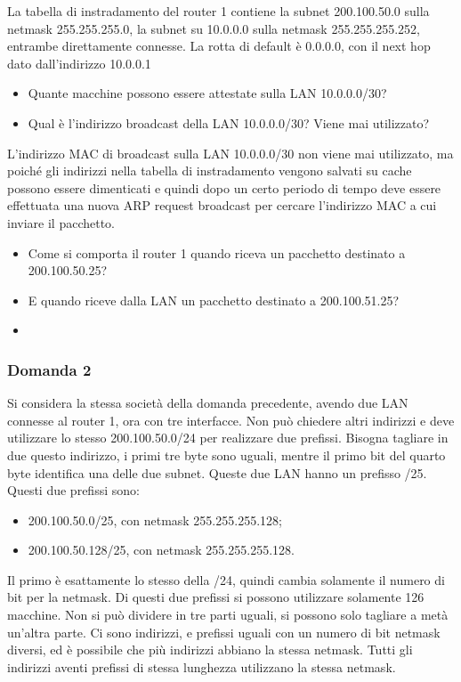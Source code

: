 \documentclass{article}
\numberwithin{equation}{subsection}
\begin{document}
La tabella di instradamento del router 1 contiene la subnet 200.100.50.0 sulla netmask 255.255.255.0, la subnet su 10.0.0.0 sulla netmask 
255.255.255.252, entrambe direttamente connesse. La rotta di default è 0.0.0.0, con il next hop dato dall'indirizzo 10.0.0.1



\begin{itemize}
    \item Quante macchine possono essere attestate sulla LAN 10.0.0.0/30?
    \item Qual è l'indirizzo broadcast della LAN 10.0.0.0/30? Viene mai utilizzato?
\end{itemize}

L'indirizzo MAC di broadcast sulla LAN 10.0.0.0/30 non viene mai utilizzato, ma poiché gli indirizzi nella tabella di instradamento vengono 
salvati su cache possono essere dimenticati e quindi dopo un certo periodo di tempo deve essere effettuata una nuova ARP request broadcast per 
cercare l'indirizzo MAC a cui inviare il pacchetto. 

\begin{itemize}
    \item Come si comporta il router 1 quando riceva un pacchetto destinato a 200.100.50.25?
    \item E quando riceve dalla LAN un pacchetto destinato a 200.100.51.25?
    \item 
\end{itemize}

\subsubsection*{Domanda 2}

Si considera la stessa società della domanda precedente, avendo due LAN connesse al router 1, ora con tre interfacce. Non può chiedere altri indirizzi 
e deve utilizzare lo stesso 200.100.50.0/24 per realizzare due prefissi. Bisogna tagliare in due questo indirizzo, i primi tre byte sono uguali, 
mentre il primo bit del quarto byte identifica una delle due subnet. Queste due LAN hanno un prefisso /25. Questi due prefissi sono:
\begin{itemize}
    \item 200.100.50.0/25, con netmask 255.255.255.128;
    \item 200.100.50.128/25, con netmask 255.255.255.128.
\end{itemize}

Il primo è esattamente lo stesso della /24, quindi cambia solamente il numero di bit per la netmask. Di questi due prefissi si possono utilizzare 
solamente 126 macchine. Non si può dividere in tre parti uguali, si possono solo tagliare a metà un'altra parte. Ci sono indirizzi, e prefissi 
uguali con un numero di bit netmask diversi, ed è possibile che più indirizzi abbiano la stessa netmask. Tutti gli indirizzi aventi prefissi di 
stessa lunghezza utilizzano la stessa netmask. 
\end{document}
